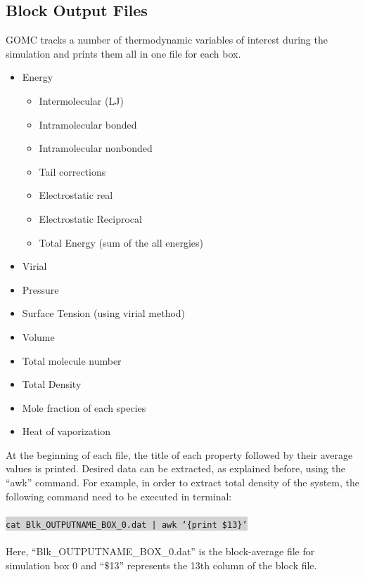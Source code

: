 \subsection{Block Output Files}
GOMC tracks a number of thermodynamic variables of interest during the simulation and prints them all in one file for each box.
\begin{itemize}
\item Energy
	\begin{itemize}
	\item Intermolecular (LJ)
	\item Intramolecular bonded
	\item Intramolecular nonbonded
	\item Tail corrections
	\item Electrostatic real
	\item Electrostatic Reciprocal
	\item Total Energy (sum of the all energies)
	\end{itemize}
\item Virial
\item Pressure 
\item Surface Tension (using virial method)
\item Volume
\item Total molecule number
\item Total Density
\item Mole fraction of each species
\item Heat of vaporization
\end{itemize}
At the beginning of each file, the title of each property followed by their average values is printed. Desired data can be extracted, as explained before, using the ``awk'' command. For example, in order to extract total density of the system, the following command need to be executed in terminal:\\\\
\colorbox{lightgray}{
\texttt{cat Blk\_OUTPUTNAME\_BOX\_0.dat | awk `\{{print \$13}\}'}
}\\\\
Here, ``Blk\_OUTPUTNAME\_BOX\_0.dat'' is the block-average file for simulation box 0 and ``\$13'' represents the 13th column of the block file.
\newpage

